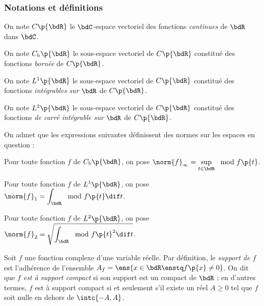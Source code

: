 \documentclass[a4paper,french,bookmarks]{article}
\begin{document}
    \renewcommand{\thesection}{\Roman{section}}
    \renewcommand{\thesubsection}{\Roman{section}.\Alph{subsection}}
    \renewcommand{\labelenumi}{\thesubsection.\arabic{enumi})}
    \renewcommand*{\labelenumii}{\alph{enumii})}

    
    \subsubsection*{Notations et définitions}
    
    \begin{enumerate}
        \itt On note $C\p{\bdR}$ le $\bdC$-espace vectoriel des fonctions \emph{continues} de $\bdR$ dans $\bdC$.
        
        \itt On note $C_\text b\p{\bdR}$ le sous-espace vectoriel de $C\p{\bdR}$ constitué des fonctions \emph{bornée} de $C\p{\bdR}$.
        
        \itt On note $L^1\p{\bdR}$ le sous-espace vectoriel de $C\p{\bdR}$ constitué des fonctions \emph{intégrables sur $\bdR$} de $C\p{\bdR}$.
        
        \itt On note $L^2\p{\bdR}$ le sous-espace vectoriel de $C\p{\bdR}$ constitué des fonctions \emph{de carré intégrable sur $\bdR$} de $C\p{\bdR}$.
    \end{enumerate}
    
    On admet que les expressions suivantes définissent des normes sur les espaces en question :
    
    \begin{enumerate}
        \itt Pour toute fonction $f$ de $C_\text b\p{\bdR}$, on pose $\norm{f}_\infty = \sup\limits_{t \in \bdR} \mod{f\p{t}}$.
        
        \itt Pour toute fonction $f$ de $L^1\p{\bdR}$, on pose $\norm{f}_1 = \displaystyle\int_\bdR \mod{f\p{t}}\dif t$.
        
        \itt Pour toute fonction $f$ de $L^2\p{\bdR}$, on pose $\norm{f}_2 = \displaystyle\sqrt{\int_\bdR \mod{f\p{t}}^2\dif t}$.
    \end{enumerate}
    
    Soit $f$ une fonction complexe d'une variable réelle. Par définition, le \emph{support de $f$} est l'adhérence de l'ensemble $A_f = \ens{x \in \bdR \enstq f\p{x} \neq 0}$. On dit que \emph{$f$ est à support compact} si son support est un compact de $\bdR$ ; en d'autres termes, $f$ est à support compact si et seulement s'il existe un réel $A \geq 0$ tel que $f$ soit nulle en dehors de $\intc{-A, A}$.
    
\end{document}
